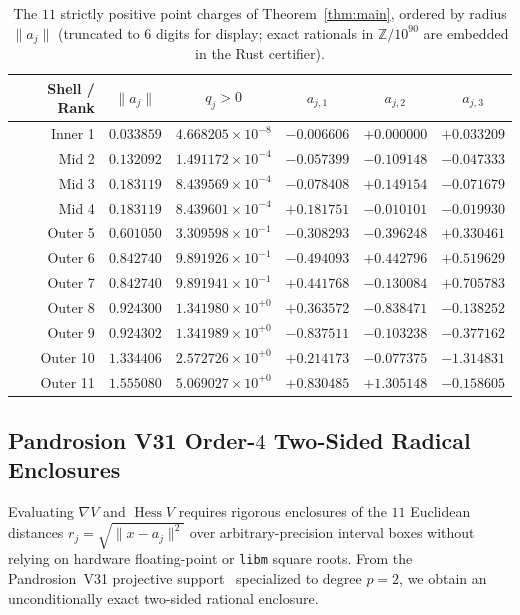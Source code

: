 \documentclass[11pt,a4paper]{amsart}
\theoremstyle{definition}
\newcommand{\Z}{\mathbb{Z}}
\DeclareMathOperator{\Hess}{Hess}
\begin{document}
\begin{table}[ht]
\centering
\caption{The $11$ strictly positive point charges of Theorem~\ref{thm:main},
ordered by radius $\|a_j\|$ (truncated to $6$ digits for display; exact
rationals in $\Z / 10^{90}$ are embedded in the Rust certifier).}\label{tab:charges}
\small
\begin{tabular}{@{}rccccc@{}}
\toprule
Shell / Rank & $\|a_j\|$ & $q_j > 0$ & $a_{j,1}$ & $a_{j,2}$ & $a_{j,3}$ \\
\midrule
Inner 1  & $0.033859$ & $4.668205\times 10^{-8}$ & $-0.006606$ & $+0.000000$ & $+0.033209$ \\
Mid 2    & $0.132092$ & $1.491172\times 10^{-4}$ & $-0.057399$ & $-0.109148$ & $-0.047333$ \\
Mid 3    & $0.183119$ & $8.439569\times 10^{-4}$ & $-0.078408$ & $+0.149154$ & $-0.071679$ \\
Mid 4    & $0.183119$ & $8.439601\times 10^{-4}$ & $+0.181751$ & $-0.010101$ & $-0.019930$ \\
Outer 5  & $0.601050$ & $3.309598\times 10^{-1}$ & $-0.308293$ & $-0.396248$ & $+0.330461$ \\
Outer 6  & $0.842740$ & $9.891926\times 10^{-1}$ & $-0.494093$ & $+0.442796$ & $+0.519629$ \\
Outer 7  & $0.842740$ & $9.891941\times 10^{-1}$ & $+0.441768$ & $-0.130084$ & $+0.705783$ \\
Outer 8  & $0.924300$ & $1.341980\times 10^{+0}$ & $+0.363572$ & $-0.838471$ & $-0.138252$ \\
Outer 9  & $0.924302$ & $1.341989\times 10^{+0}$ & $-0.837511$ & $-0.103238$ & $-0.377162$ \\
Outer 10 & $1.334406$ & $2.572726\times 10^{+0}$ & $+0.214173$ & $-0.077375$ & $-1.314831$ \\
Outer 11 & $1.555080$ & $5.069027\times 10^{+0}$ & $+0.830485$ & $+1.305148$ & $-0.158605$ \\
\bottomrule
\end{tabular}
\end{table}

\subsection{Pandrosion V31 Order-$4$ Two-Sided Radical Enclosures}

Evaluating $\nabla V$ and $\Hess V$ requires rigorous enclosures of the $11$
Euclidean distances $r_j = \sqrt{\|x - a_j\|^2}$ over arbitrary-precision
interval boxes without relying on hardware floating-point or \texttt{libm}
square roots. From the Pandrosion~V31 projective support~\cite{PandrosionV31}
specialized to degree $p = 2$, we obtain an unconditionally exact two-sided
rational enclosure.
\end{document}
